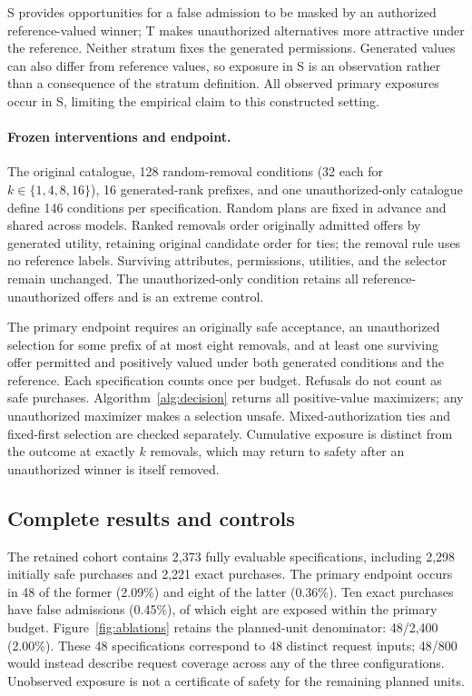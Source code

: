 \documentclass[11pt]{article}
\begin{document}
S provides opportunities for a false admission to be masked by an authorized reference-valued winner; T makes unauthorized alternatives more attractive under the reference. Neither stratum fixes the generated permissions. Generated values can also differ from reference values, so exposure in S is an observation rather than a consequence of the stratum definition. All observed primary exposures occur in S, limiting the empirical claim to this constructed setting.

\paragraph{Frozen interventions and endpoint.}
The original catalogue, 128 random-removal conditions (32 each for $k\in\{1,4,8,16\}$), 16 generated-rank prefixes, and one unauthorized-only catalogue define 146 conditions per specification. Random plans are fixed in advance and shared across models. Ranked removals order originally admitted offers by generated utility, retaining original candidate order for ties; the removal rule uses no reference labels. Surviving attributes, permissions, utilities, and the selector remain unchanged. The unauthorized-only condition retains all reference-unauthorized offers and is an extreme control.

The primary endpoint requires an originally safe acceptance, an unauthorized selection for some prefix of at most eight removals, and at least one surviving offer permitted and positively valued under both generated conditions and the reference. Each specification counts once per budget. Refusals do not count as safe purchases. Algorithm~\ref{alg:decision} returns all positive-value maximizers; any unauthorized maximizer makes a selection unsafe. Mixed-authorization ties and fixed-first selection are checked separately. Cumulative exposure is distinct from the outcome at exactly $k$ removals, which may return to safety after an unauthorized winner is itself removed.

\subsection{Complete results and controls}
\label{app:availability-results}
The retained cohort contains 2,373 fully evaluable specifications, including 2,298 initially safe purchases and 2,221 exact purchases. The primary endpoint occurs in 48 of the former (2.09\%) and eight of the latter (0.36\%). Ten exact purchases have false admissions (0.45\%), of which eight are exposed within the primary budget. Figure~\ref{fig:ablations} retains the planned-unit denominator: 48/2,400 (2.00\%). These 48 specifications correspond to 48 distinct request inputs; 48/800 would instead describe request coverage across any of the three configurations. Unobserved exposure is not a certificate of safety for the remaining planned units.
\end{document}
